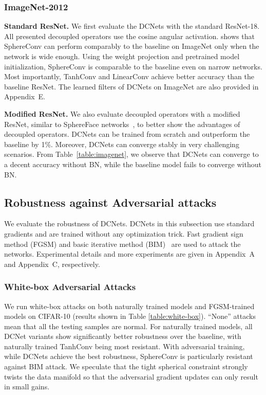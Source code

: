 \subsubsection{ImageNet-2012}

\textbf{Standard ResNet.} We first evaluate the DCNets with the standard ResNet-18. All presented decoupled operators use the cosine angular activation. \cite{liu2017deephyper} shows that SphereConv can perform comparably to the baseline on ImageNet only when the network is wide enough. Using the weight projection and pretrained model initialization, SphereConv is comparable to the baseline even on narrow networks. Most importantly, TanhConv and LinearConv achieve better accuracy than the baseline ResNet. The learned filters of DCNets on ImageNet are also provided in Appendix~\textcolor[rgb]{0.7551,0.2333,0.3333}{E}.
\par

\textbf{Modified ResNet.} We also evaluate decoupled operators with a modified ResNet, similar to SphereFace networks~\cite{liu2017sphereface}, to better show the advantages of decoupled operators. DCNets can be trained from scratch and outperform the baseline by 1\%. Moreover, DCNets can converge stably in very challenging scenarios. From Table~\ref{table:imagenet}, we observe that DCNets can converge to a decent accuracy without BN, while the baseline model fails to converge without BN.

\subsection{Robustness against Adversarial attacks}

We evaluate the robustness of DCNets. DCNets in this subsection use standard gradients and are trained without any optimization trick. Fast gradient sign method (FGSM) \cite{goodfellow2014explaining} and basic iterative method (BIM)~\cite{kurakin2016adversarial} are used to attack the networks. Experimental details and more experiments are given in Appendix~\textcolor[rgb]{0.7551,0.2333,0.3333}{A} and Appendix~\textcolor[rgb]{0.7551,0.2333,0.3333}{C}, respectively.

\subsubsection{White-box Adversarial Attacks}

We run white-box attacks on both naturally trained models and FGSM-trained models on CIFAR-10 (results shown in Table \ref{table:white-box}). ``None'' attacks mean that all the testing samples are normal. For naturally trained models, all DCNet variants show significantly better robustness over the baseline, with naturally trained TanhConv being most resistant. With adversarial training, while DCNets achieve the best robustness, SphereConv is particularly resistant against BIM attack. We speculate that the tight spherical constraint strongly twists the data manifold so that the adversarial gradient updates can only result in small gains.

